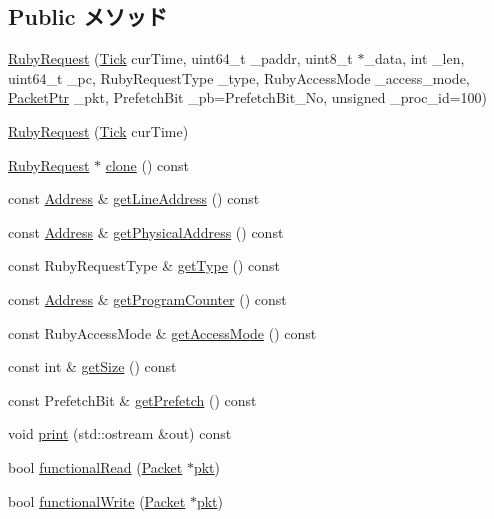 \subsection*{Public メソッド}
\begin{DoxyCompactItemize}
\item 
\hyperlink{classRubyRequest_addadf754744cca088ebfc27c8749f0e1}{RubyRequest} (\hyperlink{base_2types_8hh_a5c8ed81b7d238c9083e1037ba6d61643}{Tick} curTime, uint64\_\-t \_\-paddr, uint8\_\-t $\ast$\_\-data, int \_\-len, uint64\_\-t \_\-pc, RubyRequestType \_\-type, RubyAccessMode \_\-access\_\-mode, \hyperlink{classPacket}{PacketPtr} \_\-pkt, PrefetchBit \_\-pb=PrefetchBit\_\-No, unsigned \_\-proc\_\-id=100)
\item 
\hyperlink{classRubyRequest_a5b30411c5d1e4fa31513ce58b01b4c41}{RubyRequest} (\hyperlink{base_2types_8hh_a5c8ed81b7d238c9083e1037ba6d61643}{Tick} curTime)
\item 
\hyperlink{classRubyRequest}{RubyRequest} $\ast$ \hyperlink{classRubyRequest_a2589cd17f2bbc4a7cd72c3996d880819}{clone} () const 
\item 
const \hyperlink{classAddress}{Address} \& \hyperlink{classRubyRequest_a6cefddc635a0735c8131dbef85b4231c}{getLineAddress} () const 
\item 
const \hyperlink{classAddress}{Address} \& \hyperlink{classRubyRequest_abbc0034e2c929ff925dc7c9fd1128110}{getPhysicalAddress} () const 
\item 
const RubyRequestType \& \hyperlink{classRubyRequest_a0d40c12aa8cabb3a72487962e0b96f06}{getType} () const 
\item 
const \hyperlink{classAddress}{Address} \& \hyperlink{classRubyRequest_a9be9ffdd4d619ecc2572291d09e374ed}{getProgramCounter} () const 
\item 
const RubyAccessMode \& \hyperlink{classRubyRequest_ada8f61552814cdc121bec32f1ec92660}{getAccessMode} () const 
\item 
const int \& \hyperlink{classRubyRequest_a50b2018251eb77a7549ee1d6e99df50f}{getSize} () const 
\item 
const PrefetchBit \& \hyperlink{classRubyRequest_ad92e4eed0c01509c3469c38da385d0c0}{getPrefetch} () const 
\item 
void \hyperlink{classRubyRequest_ac55fe386a101fbae38c716067c9966a0}{print} (std::ostream \&out) const 
\item 
bool \hyperlink{classRubyRequest_a729f57f557bb42c045c47d9388f1030e}{functionalRead} (\hyperlink{classPacket}{Packet} $\ast$\hyperlink{classRubyRequest_a3a891bc2a0fcbe6be5297077d94e2df7}{pkt})
\item 
bool \hyperlink{classRubyRequest_a14bf46f4c6bb79e5357096af6b9dbffa}{functionalWrite} (\hyperlink{classPacket}{Packet} $\ast$\hyperlink{classRubyRequest_a3a891bc2a0fcbe6be5297077d94e2df7}{pkt})
\end{DoxyCompactItemize}
